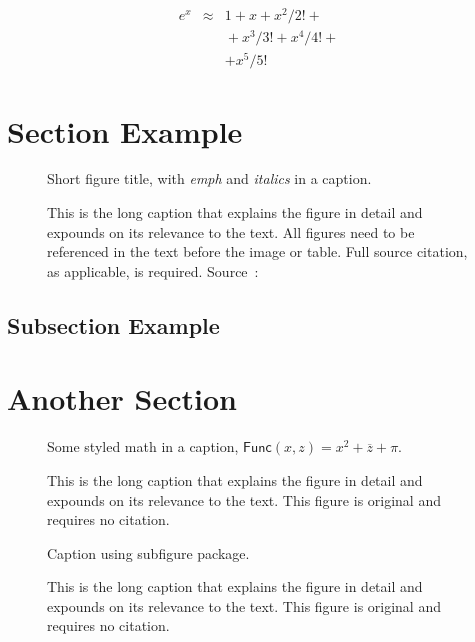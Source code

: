 \lipsum*[65]
\begin{eqnarray}
 e^x &\approx& 1+x+x^2/2! + \\
   && {}+x^3/3! + x^4/4! + \\
   && + x^5/5!
\end{eqnarray}

\section{Section Example}
\lipsum[47]

\begin{figure}[!htb]
\framebox[\textwidth]{\parbox{\textwidth}{\lipsum[65]}}
\caption{Short figure title, with \emph{emph} and \textit{italics} in a caption.}
\caption*{\small This is the long caption that explains the figure in detail and
expounds on its relevance to the text.
All figures need to be referenced in the text before the image or table.
Full source citation, as applicable, is required.
Source~\cite{IEEEexample:bibtexguide}: }
\end{figure}

\subsection{Subsection Example}
\lipsum[56]

\section{Another Section}
\lipsum[55-56]

\begin{figure}[!htb]
\framebox[\textwidth]{\parbox{\textwidth}{\lipsum[65]}}
\caption{Some styled math in a caption, $\mathsf{Func}(x, z) = x^2 + \overline{z} + \pi$.}
\caption*{\small This is the long caption that explains the figure in detail
and expounds on its relevance to the text.
This figure is original and requires no citation.}
\end{figure}

\begin{figure}[!htb]
\centering
{}
\hfill
{}
\caption{Caption using subfigure package.}
\caption*{\small This is the long caption that explains the figure in detail
and expounds on its relevance to the text.
This figure is original and requires no citation.}
\end{figure}


